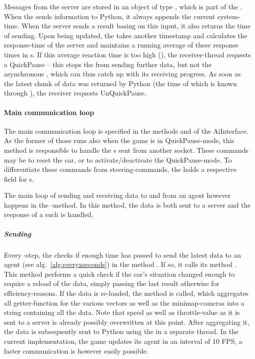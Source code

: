 Messages from the server are stored in an object of type , which is part of the . When the  sends information to Python, it always appends the current system-time. When the server sends a result basing on this input, it also returns the time of sending. Upon being updated, the  takes another timestamp and calculates the response-time of the server and maintains a running average of these response times in s. If this average reaction time is too high (), the receiver-thread requests a QuickPause -- this stops the  from sending further data, but not the asynchronous , which can thus catch up with its receiving progress. As soon as the latest chunk of data was returned by Python (the time of which is known through ), the receiver requests UnQuickPause.

\paragraph{Main communication loop} 
The main communication loop is specified in the methods  and  of the AiInterface. As the former of those runs also when the game is in QuickPause-mode, this method is responsible to handle the s sent from another socket. These commands may be to reset the car, or to activate/deactivate the QuickPause-mode. To differentiate these commands from steering-commands, the  holds a respective field for s.

The main loop of sending and receiving data to and from an agent however happens in the -method. In this method, the data is both sent to a server and the response of a such is handled.

\subparagraph{Sending}
Every -step, the  checks if enough time has passed to send the latest data to an agent (see alg.~\ref{alg:everyxseconds}) in the method . If so, it calls its method . This method performs a quick check if the car's situation changed enough to require a reload of the data, simply passing the last result otherwise for efficiency-reasons. If the data is re-loaded, the method  is called, which aggregates all getter-function for the various vectors as well as the minimap-cameras into a string containing all the data. Note that speed as well as throttle-value as it is sent to a server is already possibly overwritten at this point. After aggregating it, the data is subsequently sent to Python using the  in a separate thread. In the current implementation, the game updates its agent in an interval of 10 FPS, a faster communication is however easily possible.

